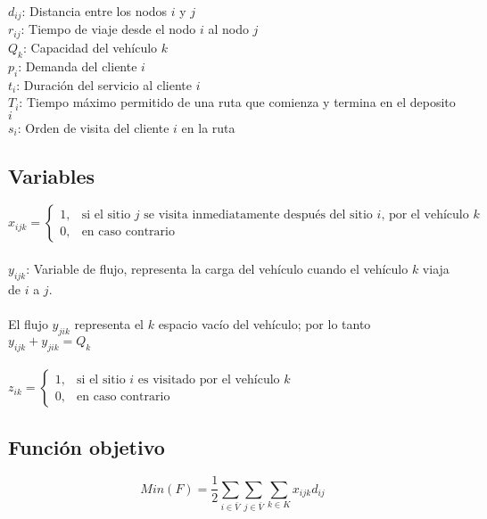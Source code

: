 \documentclass[letter, 10pt]{article}
\begin{document}
$d_{ij}$: Distancia entre los nodos $i$ y $j$\\

$r_{ij}$: Tiempo de viaje desde el nodo $i$ al nodo $j$\\

$Q_{k}$: Capacidad del vehículo $k$\\

$p_{i}$: Demanda del cliente $i$\\

$t_{i}$: Duración del servicio al cliente $i$\\

$T_{i}$: Tiempo máximo permitido de una ruta que comienza y termina en el deposito $i$\\

$s_{i}$: Orden de visita del cliente $i$ en la ruta

\subsection{Variables}

$x_{ijk} = \begin{cases}
            1, & \text{si el sitio $j$ se visita inmediatamente después del sitio $i$, por el vehículo $k$} \\
            0, & \text{en caso contrario}
    \end{cases}$
\\
\\

$y_{ijk}$: Variable de flujo, representa la carga del vehículo cuando el vehículo $k$ viaja de $i$ a $j$.
\\
\\

El flujo $y_{jik}$ representa el $k$ espacio vacío del vehículo; por lo tanto $y_{ijk} + y_{jik} = Q_{k}$
\\
\\

$z_{ik} = \begin{cases}
            1, & \text{si el sitio $i$ es visitado por el vehículo $k$} \\
            0, & \text{en caso contrario}
    \end{cases}$

\subsection{Función objetivo}

\begin{equation}
    \label{eq:FuncionObjetivo}
    Min(F) = \frac{1}{2}\sum_{i \in \bar{V}} \sum_{j \in \bar{V}} \sum_{k \in K}{x_{ijk}d_{ij}}
\end{equation}
\end{document}
